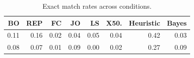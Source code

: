\begin{table}
\centering
\caption{Exact match rates across conditions.}
\centering
\fontsize{10}{12}\selectfont
\begin{tabular}[t]{rrrrrrrr}
\toprule
BO & REP & FC & JO & LS & X50. & Heuristic & Bayes\\
\midrule
0.11 & 0.16 & 0.02 & 0.04 & 0.05 & 0.04 & 0.42 & 0.03\\
0.08 & 0.07 & 0.01 & 0.09 & 0.00 & 0.02 & 0.27 & 0.09\\
\bottomrule
\end{tabular}
\end{table}
